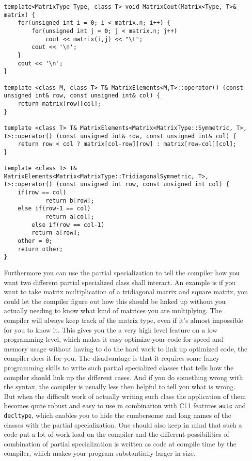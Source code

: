 \documentclass[11pt,english,a4paper]{article}
\begin{document}
\begin{flushleft}
\begin{lstlisting}[title={Printing a matrix}]
template<MatrixType Type, class T> void MatrixCout(Matrix<Type, T>& matrix) {
    for(unsigned int i = 0; i < matrix.n; i++) {
        for(unsigned int j = 0; j < matrix.n; j++)
            cout << matrix(i,j) << "\t";
        cout << '\n';
    }
    cout << '\n';
}

template <class M, class T> T& MatrixElements<M,T>::operator() (const unsigned int& row, const unsigned int& col) { 
	return matrix[row][col];
}

template <class T> T& MatrixElements<Matrix<MatrixType::Symmetric, T>, T>::operator() (const unsigned int& row, const unsigned int& col) {
	return row < col ? matrix[col-row][row] : matrix[row-col][col];
}

template <class T> T& MatrixElements<Matrix<MatrixType::TridiagonalSymmetric, T>, T>::operator() (const unsigned int row, const unsigned int col) {    
   	if(row == col)
    		return b[row];
   	else if(row-1 == col)
    		return a[col];
    	else if(row == col-1)
		return a[row];
	other = 0;
	return other;
}
\end{lstlisting}

Furthermore you can use the partial specialization to tell the compiler how you want two different partial specialized class shall interact. An example is if you want to take matrix multiplication of a tridiagonal matrix and square matrix, you could let the compiler figure out how this should be linked up without you actually needing to know what kind of matrices you are multiplying. The compiler will always keep track of the matrix type, even if it's almost impossible for you to know it. This gives you the a very high level feature on a low programming level, which makes it easy optimize your code for speed and memory usage without having to do the hard work to link up optimized code, the compiler does it for you. The disadvantage is that it requires some fancy programming skills to write such partial specialized classes that tells how the compiler should link up the different cases. And if you do something wrong with the syntax, the compiler is usually less then helpful to tell you what is wrong. But when the difficult work of actually writing such class the application of them becomes quite robust and easy to use in combination with C11 features \texttt{auto} and \texttt{decltype}, which enables you to hide the cumbersome and long names of the classes with the partial specialization. One should also keep in mind that such a code put a lot of work load on the compiler and the different possibilities of combination of partial specialization is written as code at compile time by the compiler, which makes your program substantially larger in size. \linebreak


\end{flushleft}
\end{document}
